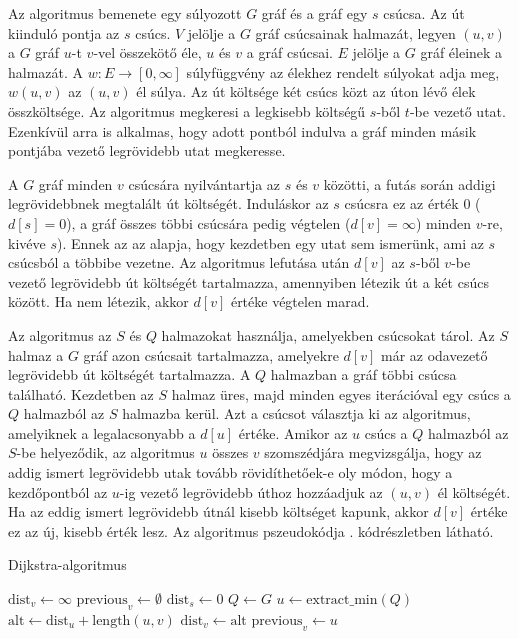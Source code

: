 Az algoritmus bemenete egy súlyozott $G$ gráf és a gráf egy $s$ csúcsa. Az út kiinduló pontja az $s$ csúcs. $V$ jelölje a $G$ gráf csúcsainak halmazát, legyen $(u, v)$ a $G$ gráf $u$-t $v$-vel összekötő éle, $u$ és $v$ a gráf csúcsai. $E$ jelölje a $G$ gráf éleinek a halmazát. A $w: E \rightarrow [0, \infty]$ súlyfüggvény az élekhez rendelt súlyokat adja meg, $w(u, v)$ az $(u, v)$ él súlya. Az út költsége két csúcs közt az úton lévő élek összköltsége. Az algoritmus megkeresi a legkisebb költségű $s$-ből $t$-be vezető utat. Ezenkívül arra is alkalmas, hogy adott pontból indulva a gráf minden másik pontjába vezető legrövidebb utat megkeresse.

A $G$ gráf minden $v$ csúcsára nyilvántartja az $s$ és $v$ közötti, a futás során addigi legrövidebbnek megtalált út költségét. Induláskor az $s$ csúcsra ez az érték $0$ ($d[s] = 0$), a gráf összes többi csúcsára pedig végtelen ($d[v] = \infty$) minden $v$-re, kivéve $s$). Ennek az az alapja, hogy kezdetben egy utat sem ismerünk, ami az $s$ csúcsból a többibe vezetne. Az algoritmus lefutása után $d[v]$ az $s$-ből $v$-be vezető legrövidebb út költségét tartalmazza, amennyiben létezik út a két csúcs között. Ha nem létezik, akkor $d[v]$ értéke végtelen marad.

Az algoritmus az $S$ és $Q$ halmazokat használja, amelyekben csúcsokat tárol. Az $S$ halmaz a $G$ gráf azon csúcsait tartalmazza, amelyekre $d[v]$ már az odavezető legrövidebb út költségét tartalmazza. A $Q$ halmazban a gráf többi csúcsa található. Kezdetben az $S$ halmaz üres, majd minden egyes iterációval egy csúcs a $Q$ halmazból az $S$ halmazba kerül. Azt a csúcsot választja ki az algoritmus, amelyiknek a legalacsonyabb a $d[u]$ értéke. Amikor az $u$ csúcs a $Q$ halmazból az $S$-be helyeződik, az algoritmus $u$ összes $v$ szomszédjára megvizsgálja, hogy az addig ismert legrövidebb utak tovább rövidíthetőek-e oly módon, hogy a kezdőpontból az $u$-ig vezető legrövidebb úthoz hozzáadjuk az $(u, v)$ él költségét. Ha az eddig ismert legrövidebb útnál kisebb költséget kapunk, akkor $d[v]$ értéke ez az új, kisebb érték lesz. Az algoritmus pszeudokódja . kódrészletben látható.

\begin{algorithm}
\caption{Dijkstra-algoritmus}
\begin{algorithmic}[1]
    \STATE $\text{dist}_v \gets \infty$
    \STATE $\text{previous}_v \gets \emptyset$
\ENDFOR
\STATE $\text{dist}_s \gets 0$
\STATE $Q \gets G$
    \STATE $u \gets \text{extract\_min}(Q)$
        \STATE $\text{alt} \gets \text{dist}_u + \text{length}(u, v)$
            \STATE $\text{dist}_v \gets \text{alt}$
            \STATE $\text{previous}_v \gets u$
        \ENDIF
    \ENDFOR
\ENDWHILE
\end{algorithmic}
\label{algo:dijkstra}
\end{algorithm}

